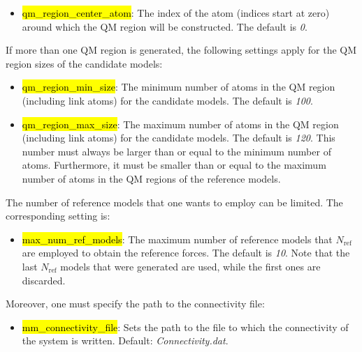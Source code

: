 \documentclass[]{tufte-book}
\begin{document}
{{\begin{itemize}
\item \hl{qm\_region\_center\_atom}: The index of the atom (indices start at zero) around which the QM region will be constructed. The default is \textit{0}.
\end{itemize}

If more than one QM region is generated, the following settings apply for the QM region sizes of the candidate models:

\begin{itemize}
\item \hl{qm\_region\_min\_size}: The minimum number of atoms in the QM region (including link atoms) for the candidate models. The default is \textit{100}.
\item \hl{qm\_region\_max\_size}: The maximum number of atoms in the QM region (including link atoms) for the candidate models. The default is \textit{120}. This number must always be larger than or equal to the minimum number of atoms. Furthermore, it must be smaller than or equal to the maximum number of atoms in the QM regions of the reference models.
\end{itemize}

The number of reference models that one wants to employ can be limited. The corresponding setting is:

\begin{itemize}
\item \hl{max\_num\_ref\_models}: The maximum number of reference models that $N_\text{ref}$ are employed to obtain the reference forces. The default is \textit{10}. Note that the last $N_\text{ref}$ models that were generated are used, while the first ones are discarded.
\end{itemize}

Moreover, one must specify the path to the connectivity file:

\begin{itemize}
\item \hl{mm\_connectivity\_file}: Sets the path to the file to which the connectivity of the system is written. Default: \textit{Connectivity.dat}.
\end{itemize}

}}
\end{document}
